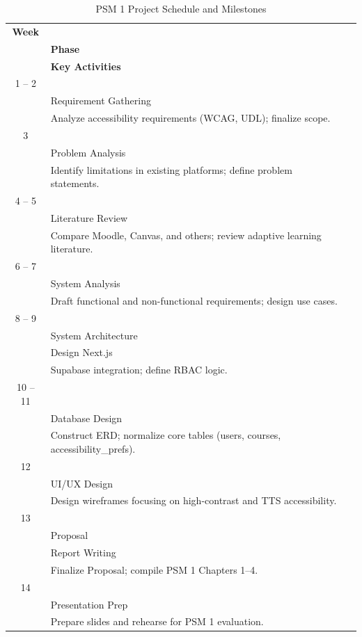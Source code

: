 \documentclass[12pt,a4paper]{report}
\begin{document}
\begin{table}[h]
\caption{PSM 1 Project Schedule and Milestones}
\label{Table2.1}
\vspace{-4mm}
\begin{center}
\begin{tabular}{|c | p{5cm} | p{8cm} |}
\hline
\textbf{Week} \\& \textbf{Phase} \\& \textbf{Key Activities} \\
\hline \hline
1 -- 2 \\& Requirement Gathering \\& Analyze accessibility requirements (WCAG, UDL); finalize scope. \\
\hline
3 \\& Problem Analysis \\& Identify limitations in existing platforms; define problem statements. \\
\hline
4 -- 5 \\& Literature Review \\& Compare Moodle, Canvas, and others; review adaptive learning literature. \\
\hline
6 -- 7 \\& System Analysis \\& Draft functional and non-functional requirements; design use cases. \\
\hline
8 -- 9 \\& System Architecture \\& Design Next.js \\& Supabase integration; define RBAC logic. \\
\hline
10 -- 11 \\& Database Design \\& Construct ERD; normalize core tables (users, courses, accessibility\_prefs). \\
\hline
12 \\& UI/UX Design \\& Design wireframes focusing on high-contrast and TTS accessibility. \\
\hline
13 \\& Proposal \\& Report Writing \\& Finalize Proposal; compile PSM 1 Chapters 1–4. \\
\hline
14 \\& Presentation Prep \\& Prepare slides and rehearse for PSM 1 evaluation. \\
\hline
\end{tabular}
\end{center}
\end{table}
\end{document}
